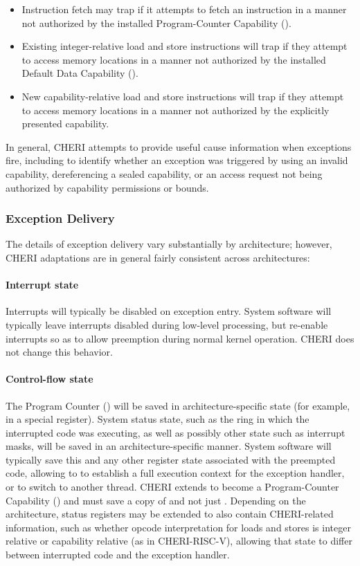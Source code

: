 \begin{itemize}
\item Instruction fetch may trap if it attempts to fetch an instruction in a
  manner not authorized by the installed Program-Counter Capability (\PCC{}).

\item Existing integer-relative load and store instructions will trap if they
  attempt to access memory locations in a manner not authorized by the
  installed Default Data Capability (\DDC{}).

\item New capability-relative load and store instructions will trap if they
  attempt to access memory locations in a manner not authorized by the
  explicitly presented capability.
\end{itemize}

\noindent
In general, CHERI attempts to provide useful cause information when exceptions
fire, including to identify whether an exception was triggered by using an
invalid capability, dereferencing a sealed capability, or an access request
not being authorized by capability permissions or bounds.

\subsubsection{Exception Delivery}

The details of exception delivery vary substantially by architecture; however,
CHERI adaptations are in general fairly consistent across architectures:

\paragraph{Interrupt state}
Interrupts will typically be disabled on exception entry.
System software will typically leave interrupts disabled during low-level
processing, but re-enable interrupts so as to allow preemption during normal
kernel operation.
CHERI does not change this behavior.

\paragraph{Control-flow state}
The Program Counter (\PC{}) will be saved in
architecture-specific state (for example, in a special register).
System status state, such as the ring in which the interrupted code was
executing, as well as possibly other state such as interrupt masks, will be
saved in an architecture-specific manner.
System software will typically save this and any other register state
associated with the preempted code, allowing to to establish a full execution
context for the exception handler, or to switch to another thread.
CHERI extends \PC{} to become a Program-Counter Capability
(\PCC{}) and must save a copy of \PCC{} and not just \PC{}.
Depending on the architecture, status registers may be extended to also
contain CHERI-related information, such as whether opcode interpretation for
loads and stores is integer relative or capability relative (as in
CHERI-RISC-V), allowing that state to differ between interrupted code and the
exception handler.

